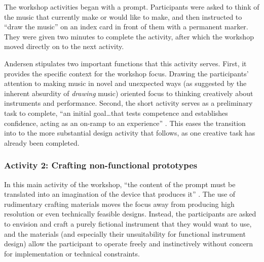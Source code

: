 \documentclass[letterpaper, 12pt]{article}
\begin{document}
The workshop activities began with a prompt. Participants were asked to think of the music that currently make or would like to make, and then instructed to ``draw the music'' on an index card in front of them with a permanent marker. They were given two minutes to complete the activity, after which the workshop moved directly on to the next activity.

Andersen stipulates two important functions that this activity serves. First, it provides the specific context for the workshop focus. 
Drawing the participants' attention to making music in novel and unexpected ways (as suggested by the inherent absurdity of \emph{drawing} music) oriented focus to thinking creatively about instruments and performance. Second, the short activity serves as a preliminary task to complete, ``an initial goal\ldots that tests competence and establishes confidence, acting as an on-ramp to an experience'' \citep[p. 5]{Andersen2019}. This eases the transition into to the more substantial design activity that follows, as one creative task has already been completed. 

\subsubsection{Activity 2: Crafting non-functional prototypes}
\label{ch3-sec:activity-2-crafting-non-functional-prototypes}

In this main activity of the workshop, ``the content of the prompt must be translated into an imagination of the device that produces it'' \citep[p. 5]{Andersen2019}. The use of rudimentary crafting materials moves the focus away from producing high resolution or even technically feasible designs. Instead, the participants are asked to envision and craft a purely fictional instrument that they would want to use, and the materials (and especially their unsuitability for functional instrument design) allow the participant to operate freely and instinctively without concern for implementation or technical constraints.
\end{document}
